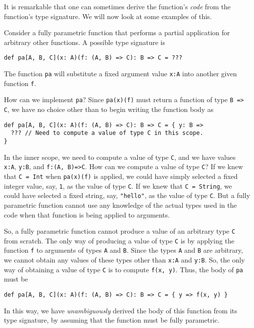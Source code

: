 It is remarkable that one can sometimes derive the function's \emph{code}
from the function's type signature. We will now look at some examples
of this.

Consider a fully parametric function that performs a partial application
for arbitrary other functions. A possible type signature is
\begin{lstlisting}
def pa[A, B, C](x: A)(f: (A, B) => C): B => C = ???
\end{lstlisting}
The function \lstinline!pa! will substitute a fixed argument value
\lstinline!x:A! into another given function \lstinline!f!. 

How can we implement \lstinline!pa!? Since \lstinline!pa(x)(f)!
must return a function of type \lstinline!B => C!, we have no choice
other than to begin writing the function body as
\begin{lstlisting}
def pa[A, B, C](x: A)(f: (A, B) => C): B => C = { y: B =>
  ??? // Need to compute a value of type C in this scope.
}
\end{lstlisting}
In the inner scope, we need to compute a value of type \lstinline!C!,
and we have values \lstinline!x:A!, \lstinline!y:B!, and \lstinline!f:(A, B)=>C!.
How can we compute a value of type \lstinline!C!? If we knew that
\lstinline!C = Int! when \lstinline!pa(x)(f)! is applied, we could
have simply selected a fixed integer value, say, \lstinline!1!, as
the value of type \lstinline!C!. If we knew that \lstinline!C = String!,
we could have selected a fixed string, say, \lstinline!"hello"!,
as the value of type \lstinline!C!. But a fully parametric function
cannot use any knowledge of the actual types used in the code when
that function is being applied to arguments.

So, a fully parametric function cannot produce a value of an arbitrary
type \lstinline!C! from scratch. The only way of producing a value
of type \lstinline!C! is by applying the function \lstinline!f!
to arguments of types \lstinline!A! and \lstinline!B!. Since the
types \lstinline!A! and \lstinline!B! are arbitrary, we cannot obtain
any values of these types other than \lstinline!x:A! and \lstinline!y:B!.
So, the only way of obtaining a value of type \lstinline!C! is to
compute \lstinline!f(x, y)!. Thus, the body of \lstinline!pa! must
be
\begin{lstlisting}
def pa[A, B, C](x: A)(f: (A, B) => C): B => C = { y => f(x, y) }
\end{lstlisting}
In this way, we have \emph{unambiguously} derived the body of this
function from its type signature, by assuming that the function must
be fully parametric.

